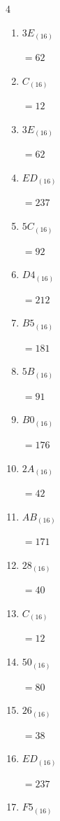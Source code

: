 \begin{multicols}{4}
\begin{enumerate}
  \item $3E_{(16)}$

        $=62$

  \item $C_{(16)}$

        $=12$

  \item $3E_{(16)}$

        $=62$

  \item $ED_{(16)}$

        $=237$

  \item $5C_{(16)}$

        $=92$

  \item $D4_{(16)}$

        $=212$

  \item $B5_{(16)}$

        $=181$

  \item $5B_{(16)}$

        $=91$

  \item $B0_{(16)}$

        $=176$

  \item $2A_{(16)}$

        $=42$

  \item $AB_{(16)}$

        $=171$

  \item $28_{(16)}$

        $=40$

  \item $C_{(16)}$

        $=12$

\columnbreak %

  \item $50_{(16)}$

        $=80$

  \item $26_{(16)}$

        $=38$

  \item $ED_{(16)}$

        $=237$

  \item $F5_{(16)}$


\end{enumerate}
\end{multicols}
